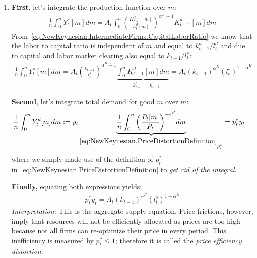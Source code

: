 \begin{enumerate}
\item
\textbf{First}, let's integrate the production function over \(m\):
\begin{align*}
\frac{1}{n} \int_{0}^{n} Y^{s}_{t}[m] dm = A_{t} \int_{0}^{n} {\left(\frac{K^{d}_{t-1}[m]}{L^{d}_{t}[m]}\right)}^{\alpha^{K}-1} K^{d}_{t-1}[m] dm
\end{align*}
From~\eqref{eq:NewKeynesian.IntermediateFirms.CapitalLaborRatio} we know that the labor to capital ratio is independent of \(m\)
  and equal to \(k^{d}_{t-1}/l^{d}_{t}\) and due to capital and labor market clearing also equal to \(k_{t-1}/l^{s}_{t}\):
\begin{align*}
\frac{1}{n} \int_{0}^{n} Y^{s}_{t}[m] dm = A_{t} {\left(\frac{k_{t-1}}{l^{s}_{t}}\right)}^{\alpha^{K}-1} \underbrace{\int_{0}^{n} K^{d}_{t-1}[m] dm}_{=k^{d}_{t-1}=k_{t-1}}
= A_{t} {(k_{t-1})}^{\alpha^{K}} {(l^{s}_{t})}^{1-\alpha^{K}}
\end{align*}

\textbf{Second}, let's integrate total demand for good \(m\) over \(m\):
\begin{align}
\frac{1}{n} \int_{0}^{n} Y^{d}_{t}[m] dm &:= y_{t}
\underbrace{\frac{1}{n} \int_{0}^{n} {\left(\frac{P_{t}[m]}{P_{t}}\right)}^{-\epsilon^{P}} dm}_{\overset{\eqref{eq:NewKeynesian.PriceDistortionDefinition}}{=}p_{t}^{*}}
= p_{t}^{*} y_{t}
\end{align}
where we simply made use of the definition of \(p_{t}^{*}\) in~\eqref{eq:NewKeynesian.PriceDistortionDefinition} to \emph{get rid of the integral}.

\textbf{Finally,} equating both expressions yields:
\begin{align*}
p_{t}^{*} y_{t} =  A_{t} {(k_{t-1})}^{\alpha^{K}} {(l^{s}_{t})}^{1-\alpha^{K}}
\end{align*}
\emph{Interpretation:} This is the aggregate supply equation.
Price frictions, however, imply that resources will not be efficiently allocated
  as prices are too high because not all firms can re-optimize their price in every period.
This inefficiency is measured by \(p_{t}^{*}\leq 1\); therefore it is called the \emph{price efficiency distortion}.


\end{enumerate}
